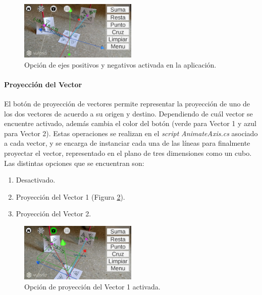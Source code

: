 \begin{figure}[hbt!]
\centering
\includegraphics[width=0.5\textwidth]{figuras/vectores/Ejes.png}
\caption{\label{fig:vec_opcion_ejes}Opción de ejes positivos y negativos activada en la aplicación.}
\end{figure}
\FloatBarrier

\paragraph{Proyección del Vector}
El botón de proyección de vectores permite representar la proyección de uno de los dos vectores de acuerdo a su origen y destino. Dependiendo de cuál vector se encuentre activado, además cambia el color del botón (verde para Vector 1 y azul para Vector 2). Estas operaciones se realizan en el \textit{script} \textit{AnimateAxis.cs} asociado a cada vector, y se encarga de instanciar cada una de las líneas para finalmente proyectar el vector, representado en el plano de tres dimensiones como un cubo. Las distintas opciones que se encuentran son:

\begin{enumerate}
    \item Desactivado.
    \item Proyección del Vector 1 (Figura \ref{fig:vec_opcion_proyeccion}).
    \item Proyección del Vector 2.
\end{enumerate}

\begin{figure}[hbt!]
\centering
\includegraphics[width=0.5\textwidth]{figuras/vectores/Proyeccion.png}
\caption{\label{fig:vec_opcion_proyeccion}Opción de proyección del Vector 1 activada.}
\end{figure}
\FloatBarrier

